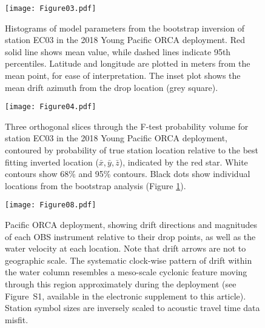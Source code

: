 \begin{figure}[h]
\texttt{[image: Figure03.pdf]}
\caption{Histograms of model parameters from the bootstrap inversion of station EC03 in the 2018 Young Pacific ORCA deployment. Red solid line shows mean value, while dashed lines indicate 95th percentiles. Latitude and longitude are plotted in meters from the mean point, for ease of interpretation. The inset plot shows the mean drift azimuth from the drop location (grey square).}
\label{fig:one_sta_real_histograms}
\end{figure}

\begin{figure}[h]
\texttt{[image: Figure04.pdf]}
\caption{ Three orthogonal slices through the F-test probability volume for station EC03 in the 2018 Young Pacific ORCA deployment, contoured by probability of true station location relative to the best fitting inverted location ($\bar{x},\bar{y},\bar{z}$), indicated by the red star. White contours show 68\% and 95\% contours. Black dots show individual locations from the bootstrap analysis (Figure \ref{fig:one_sta_real_histograms}). }
\label{fig:one_sta_real_ftests}
\end{figure}

\begin{figure}[h]
\texttt{[image: Figure08.pdf]}
\caption{Pacific ORCA deployment, showing drift directions and magnitudes of each OBS instrument relative to their drop points, as well as the water velocity at each location. Note that drift arrows are not to geographic scale. The systematic clock-wise pattern of drift within the water column resembles a meso-scale cyclonic feature moving through this region approximately during the deployment (see Figure~S1, available in the electronic supplement to this article). Station symbol sizes are inversely scaled to acoustic travel time data misfit.}
\label{fig:meso_eddy}
\end{figure}

